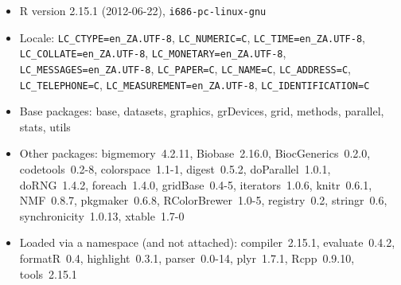 \documentclass[a4paper]{article}\usepackage{graphicx, color}
\begin{document}
\begin{itemize}\raggedright
  \item R version 2.15.1 (2012-06-22), \verb|i686-pc-linux-gnu|
  \item Locale: \verb|LC_CTYPE=en_ZA.UTF-8|, \verb|LC_NUMERIC=C|, \verb|LC_TIME=en_ZA.UTF-8|, \verb|LC_COLLATE=en_ZA.UTF-8|, \verb|LC_MONETARY=en_ZA.UTF-8|, \verb|LC_MESSAGES=en_ZA.UTF-8|, \verb|LC_PAPER=C|, \verb|LC_NAME=C|, \verb|LC_ADDRESS=C|, \verb|LC_TELEPHONE=C|, \verb|LC_MEASUREMENT=en_ZA.UTF-8|, \verb|LC_IDENTIFICATION=C|
  \item Base packages: base, datasets, graphics,
    grDevices, grid, methods, parallel, stats, utils
  \item Other packages: bigmemory~4.2.11,
    Biobase~2.16.0, BiocGenerics~0.2.0,
    codetools~0.2-8, colorspace~1.1-1, digest~0.5.2,
    doParallel~1.0.1, doRNG~1.4.2, foreach~1.4.0,
    gridBase~0.4-5, iterators~1.0.6, knitr~0.6.1,
    NMF~0.8.7, pkgmaker~0.6.8, RColorBrewer~1.0-5,
    registry~0.2, stringr~0.6, synchronicity~1.0.13,
    xtable~1.7-0
  \item Loaded via a namespace (and not attached):
    compiler~2.15.1, evaluate~0.4.2, formatR~0.4,
    highlight~0.3.1, parser~0.0-14, plyr~1.7.1,
    Rcpp~0.9.10, tools~2.15.1
\end{itemize}




\printbibliography[heading=bibintoc]
\end{document}
